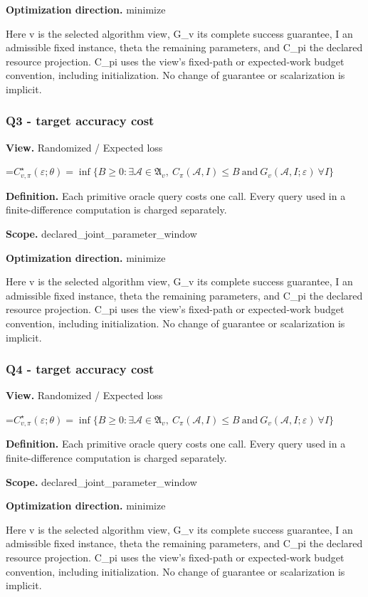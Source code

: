 \documentclass[10pt,a4paper]{article}
\newcommand{\AtlasMath}[1]{\par\begingroup\centering\setbox0=\hbox{$\displaystyle #1$}\ifdim\wd0>1.4\linewidth\typeout{ATLAS WIDE FORMULA: \the\wd0}\fi\ifdim\wd0>\linewidth\resizebox{\linewidth}{!}{\box0}\else\box0\fi\par\endgroup}
\begin{document}
\textbf{Optimization direction.} minimize

Here v is the selected algorithm view, G\_v its complete success guarantee, I an admissible fixed instance, theta the remaining parameters, and C\_pi the declared resource projection. C\_pi uses the view's fixed-path or expected-work budget convention, including initialization. No change of guarantee or scalarization is implicit.

\subsubsection{Q3 - target accuracy cost}
\textbf{View.} Randomized / Expected loss

\AtlasMath{C^\star_{v,\pi}(\varepsilon;\theta)=\inf\{B\ge0:\exists\mathcal A\in\mathfrak A_v,\ C_\pi(\mathcal A,I)\le B\ \text{and}\ G_v(\mathcal A,I;\varepsilon)\ \forall I\}}
\textbf{Definition.} Each primitive oracle query costs one call. Every query used in a finite-difference computation is charged separately.

\textbf{Scope.} declared\_joint\_parameter\_window

\textbf{Optimization direction.} minimize

Here v is the selected algorithm view, G\_v its complete success guarantee, I an admissible fixed instance, theta the remaining parameters, and C\_pi the declared resource projection. C\_pi uses the view's fixed-path or expected-work budget convention, including initialization. No change of guarantee or scalarization is implicit.

\subsubsection{Q4 - target accuracy cost}
\textbf{View.} Randomized / Expected loss

\AtlasMath{C^\star_{v,\pi}(\varepsilon;\theta)=\inf\{B\ge0:\exists\mathcal A\in\mathfrak A_v,\ C_\pi(\mathcal A,I)\le B\ \text{and}\ G_v(\mathcal A,I;\varepsilon)\ \forall I\}}
\textbf{Definition.} Each primitive oracle query costs one call. Every query used in a finite-difference computation is charged separately.

\textbf{Scope.} declared\_joint\_parameter\_window

\textbf{Optimization direction.} minimize

Here v is the selected algorithm view, G\_v its complete success guarantee, I an admissible fixed instance, theta the remaining parameters, and C\_pi the declared resource projection. C\_pi uses the view's fixed-path or expected-work budget convention, including initialization. No change of guarantee or scalarization is implicit.
\end{document}
